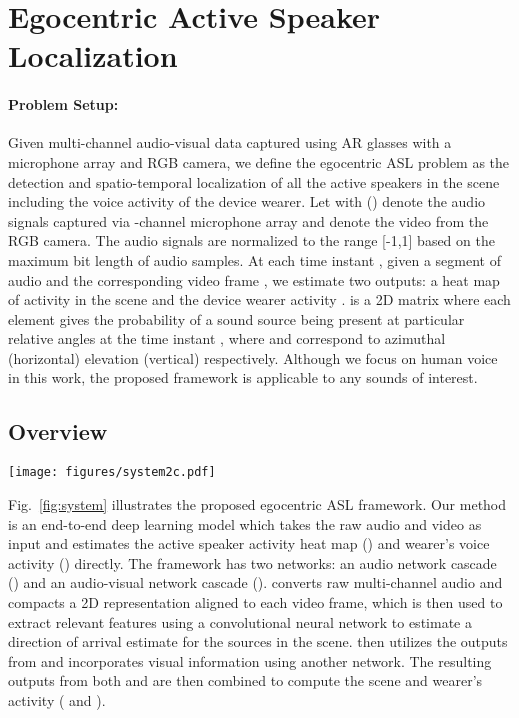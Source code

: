 \documentclass[10pt,twocolumn,letterpaper]{article}
\newcommand{\AN}{}
\newcommand{\AVN}{}
\begin{document}
\section{Egocentric Active Speaker Localization} \label{sec:framework}


\paragraph{Problem Setup:}
Given multi-channel audio-visual data captured using AR glasses with a microphone array and RGB camera, 
we define the egocentric ASL problem as the detection and spatio-temporal localization of all the active speakers in the scene including the voice activity of the device wearer. 
Let  with () denote the audio signals captured via -channel microphone array and  denote the video from the RGB camera.
The audio signals are normalized to the range [-1,1] based on the maximum bit length of audio samples.
At each time instant , given a segment of audio  and the corresponding video frame ,
we estimate two outputs: a heat map  of activity in the scene and the device wearer activity . 
 is a 2D matrix where each element gives the probability of a sound source being present at 
particular relative angles  at the time instant , 
where  and  correspond to azimuthal (horizontal) elevation (vertical) respectively. 
Although we focus on human voice in this work, the proposed framework is applicable to any sounds of interest. 

\subsection{Overview} \label{sec:overview}

\begin{figure*}[tb]
\centering
\texttt{[image: figures/system2c.pdf]}
\vspace{-5pt}
\caption{Egocentric multi-channel audio-visual localization. Our end-to-end deep network detects a 360 voice activity map
	and the wearer's voice activity at the same time.}
\vspace{-5pt}	
\label{fig:system}	
\end{figure*}

Fig.~\ref{fig:system} illustrates the proposed egocentric ASL framework. 
Our method is an end-to-end deep learning model which takes the raw audio and video as input and estimates the 
active speaker activity heat map () and wearer's voice activity () directly. 
The framework has two networks: an audio network cascade (\AN) and an audio-visual network cascade (\AVN). 
\AN  converts raw multi-channel audio and compacts a 2D representation aligned to each video frame, 
which is then used to extract relevant features using a convolutional neural network to estimate a direction of arrival estimate for the sources in the scene. 
\AVN  then utilizes the outputs from \AN  and incorporates visual information using another network. The resulting outputs from both \AN  and \AVN  are then combined to compute the scene and wearer's activity ( and ). 
\end{document}
